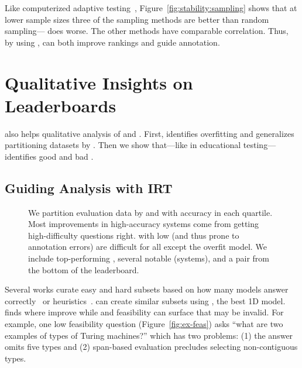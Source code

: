Like computerized adaptive testing~\citep{moreno1984cat}, Figure~\ref{fig:stability:sampling} shows that at lower sample sizes three of the \irt{} sampling methods are better than random sampling---\diff{} does worse.
The other \irt{} methods have comparable correlation.
Thus, by using \irt{}, \name{} can both improve rankings and guide annotation.
\section{Qualitative Insights on Leaderboards}
\label{ch:isicle:interp}

\name{} also helps qualitative analysis of \itms{} and \subjs{}.
First, \irt{} identifies overfitting and generalizes partitioning datasets by \diff{}.
Then we show that---like in educational testing---\irt{} identifies good and bad \itms{}.

\subsection{Guiding Analysis with IRT}

\begin{figure}[t]
    \centering
    \caption{
        We partition evaluation data by \irt{} \diff{} and
        \discability{} with accuracy in each quartile.
        Most improvements in high-accuracy systems come from getting
        high-difficulty questions right.
        \Itms{} with low \discability{} (and thus prone to annotation errors) are difficult for all \subjs{} except the overfit  model.
        We include top-performing \squad{} \subjs{}, several notable
        \subjs{} (systems), and a pair from the bottom of the leaderboard.
    }
    \label{fig:confusion}
\end{figure}

Several works curate easy and hard  subsets based on how many
models answer correctly~\citep{rondeau-18} or
heuristics~\citep{sugawara-18}.
\irt{} can create similar subsets using , the best 1D model.
\Diff{} finds where \subjs{} improve while \discability{} and
feasibility can surface \itms{} that may be invalid.
For example, one low feasibility question (Figure~\ref{fig:ex-feas}) asks
``what are two examples of types of Turing machines?'' which has two
problems: (1) the answer omits five types and (2) span-based
evaluation precludes selecting non-contiguous types.

